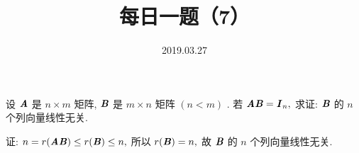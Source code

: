 \documentclass[UTF8]{ctexart}
\title{\textbf{每日一题（7）}}
\date{2019.03.27}
\begin{document}
\maketitle
设 $\textbf{\textit{A}}$ 是 $n \times m$ 矩阵, $\textbf{\textit{B}}$ 是 $m \times n$ 矩阵 $(n<m)$ . 若 $\textbf{\textit{AB}}=\textbf{\textit{I}}_n,$ 求证: $\textbf{\textit{B}}$ 的 $n$ 个列向量线性无关.

证: $n=r(\textbf{\textit{AB}}) \leq r(\textbf{\textit{B}}) \leq n,$ 所以 $r(\textbf{\textit{B}})=n,$ 故 $\textbf{\textit{B}}$ 的 $n$ 个列向量线性无关.
\end{document}
